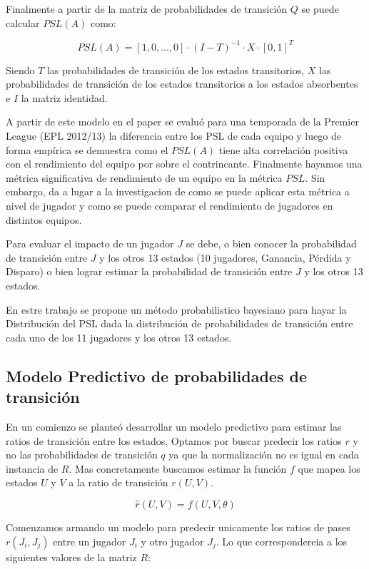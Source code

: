 \documentclass[
  a4paper,
]{article}
\begin{document}
Finalmente a partir de la matriz de probabilidades de transición \(Q\)
se puede calcular \(PSL(A)\) como:

\[
    PSL(A) = [1, 0, ..., 0] \cdot (I - T)^{-1} \cdot X \cdot [0, 1]^T
\]

Siendo \(T\) las probabilidades de transición de los estados
transitorios, \(X\) las probabilidades de transición de los estados
transitorios a los estados absorbentes e \(I\) la matriz identidad.

A partir de este modelo en el paper se evaluó para una temporada de la
Premier League (EPL 2012/13) la diferencia entre los PSL de cada equipo
y luego de forma empírica se demuestra como el \(PSL(A)\) tiene alta
correlación positiva con el rendimiento del equipo por sobre el
contrincante. Finalmente hayamos una métrica significativa de
rendimiento de un equipo en la métrica \(PSL\). Sin embargo, da a lugar
a la investigacion de como se puede aplicar esta métrica a nivel de
jugador y como se puede comparar el rendimiento de jugadores en
distintos equipos.

Para evaluar el impacto de un jugador \(J\) se debe, o bien conocer la
probabilidad de transición entre \(J\) y los otros 13 estados (10
jugadores, Ganancia, Pérdida y Disparo) o bien lograr estimar la
probabilidad de transición entre \(J\) y los otros 13 estados.

En estre trabajo se propone un método probabilistico bayesiano para
hayar la Distribución del PSL dada la distribución de probabilidades de
transición entre cada uno de los 11 jugadores y los otros 13 estados.

\hypertarget{modelo-predictivo-de-probabilidades-de-transiciuxf3n}{%
\subsection{Modelo Predictivo de probabilidades de
transición}\label{modelo-predictivo-de-probabilidades-de-transiciuxf3n}}

En un comienzo se planteó desarrollar un modelo predictivo para estimar
las ratios de transición entre los estados. Optamos por buscar predecir
los ratios \(r\) y no las probabilidades de transición \(q\) ya que la
normalización no es igual en cada instancia de \(R\). Mas concretamente
buscamos estimar la función \(f\) que mapea los estados \(U\) y \(V\) a
la ratio de transición \(r(U, V)\).

\[
    \hat{r}(U, V) = f(U, V, \theta)
\]

Comenzamos armando un modelo para predecir unicamente los ratios de
pases \(r(J_i, J_j)\) entre un jugador \(J_i\) y otro jugador \(J_j\).
Lo que correspondereia a los siguientes valores de la matriz \(R\):
\end{document}
